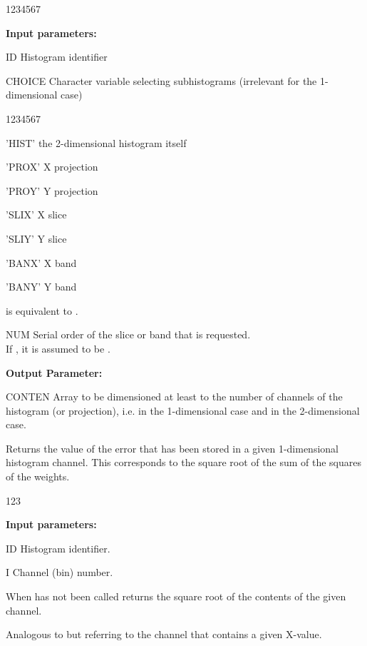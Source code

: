 \begin{DLtt}{1234567}
\item[{\rm\bf Input parameters:}]
\item[ID] Histogram identifier
\item[CHOICE] Character variable selecting subhistograms
(irrelevant for the 1-dimensional case)
\begin{DLtt}{1234567}
\item['HIST'] the 2-dimensional histogram itself
\item['PROX'] X projection
\item['PROY'] Y projection
\item['SLIX'] X slice
\item['SLIY'] Y slice
\item['BANX'] X band
\item['BANY'] Y band
\end{DLtt}
 is equivalent to .
\item[NUM] Serial order of the slice or band that is requested.\\
If , it is assumed to be .
\item[{\rm\bf Output Parameter:}]
\item[CONTEN] Array to be dimensioned at least to the number
of channels of the histogram (or projection), i.e.
 in the 1-dimensional case and
 in the 2-dimensional case.
\end{DLtt}
 
 
\Action
Returns the value of the error that has been stored in a given
1-dimensional histogram channel.
This corresponds to the square root of the sum of
the squares of the weights.
 
\begin{DLtt}{123}
\item[{\rm\bf Input parameters:}]
\item[ID] Histogram identifier.
\item[I] Channel (bin) number.
\end{DLtt}
 
When  has not been called returns
the square root of the contents of the given channel.
 
 
\Action
Analogous to  but referring to the channel that contains a given
X-value.
 

